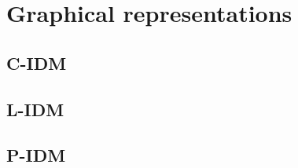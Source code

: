 %
%
\chapter{Graphical representations}
%
%
%
\section{C-IDM}
%
%
\section{L-IDM}
%
%
\section{P-IDM}
%
